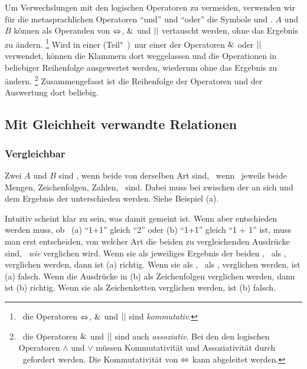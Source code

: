Um Verwechslungen mit den logischen Operatoren zu vermeiden, verwenden wir für die metasprachlichen Operatoren \enquote{und} und \enquote{oder} die Symbole \chrqt{$\metaandsym$} und \chrqt{$\metaorsym$}.
$A$ und $B$ können als Operanden von $\Leftrightarrow$, $\metaandsym$ und $\metaorsym$ vertauscht werden, ohne das Ergebnis zu ändern.%
\footnote{%
	\textDh\ die Operatoren $\Leftrightarrow$, $\metaandsym$ und $\metaorsym$ sind \emph{kommutativ}.
}
Wird in einer (Teil"~)\Aussage\ nur einer der Operatoren $\metaandsym$ oder $\metaorsym$ verwendet, können die Klammern dort weggelassen und die Operationen in beliebiger Reihenfolge ausgewertet werden, wiederum ohne das Ergebnis zu ändern.%
\footnote{%
	\textDh\ die Operatoren $\metaandsym$ und $\metaorsym$ sind auch \emph{assoziativ}.
	Bei den den logischen Operatoren $\land$ und $\lor$ müssen Kommutativität und Assoziativität durch \Axiome\ gefordert werden.
	Die Kommutativität von $\Leftrightarrow$ kann abgeleitet werden.
}
Zusammengefasst ist die Reihenfolge der Operatoren und der Auswertung dort beliebig.

\subsection{Mit Gleichheit verwandte Relationen}%
\label{sub:Gleichheit}

\subsubsection{Vergleichbar}%
\label{subsub:Vergleichbar}

Zwei  $A$ und $B$ sind , wenn beide von derselben Art sind, \textdh\ wenn \textzB\ jeweils beide Mengen, Zeichenfolgen, Zahlen, \textusw\ sind.
Dabei muss bei  zwischen der  an sich und dem Ergebnis der  unterschieden werden. Siehe Beispiel (a).

Intuitiv scheint klar zu sein, was damit  gemeint ist.
Wenn aber entschieden werden muss, ob \textzB\ (a) \enquote{1+1} gleich \enquote{2} oder (b) \enquote{1+1} gleich \enquote{1 + 1} ist, muss man erst entscheiden, von welcher Art die beiden zu vergleichenden Ausdrücke sind, \textdh\ \emph{wie} verglichen wird.
Wenn sie als jeweiliges Ergebnis der beiden , \textdh\ als , verglichen werden, dann ist (a) richtig.
Wenn sie als , \textdh\ als , verglichen werden, ist (a) falsch.
Wenn die Ausdrücke in (b) als Zeichenfolgen verglichen werden, dann ist (b) richtig.
Wenn sie als Zeichenketten verglichen werden, ist (b) falsch.


